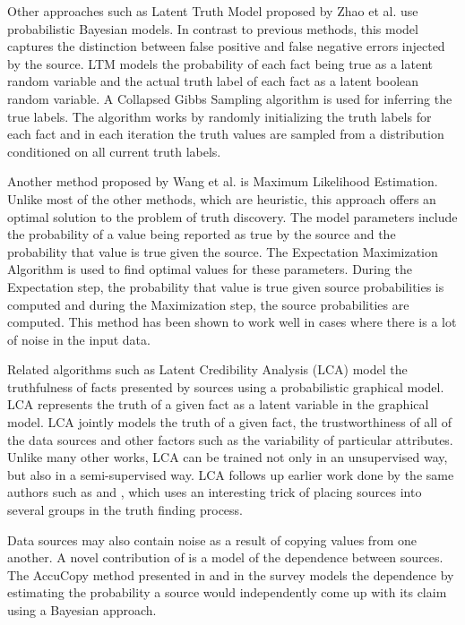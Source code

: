 \documentclass{acm_proc_article-sp}
\begin{document}
Other approaches such as Latent Truth Model proposed by Zhao et al. \cite{zhao:bayesian} use probabilistic Bayesian models. In contrast to previous methods, this model captures the distinction between false positive and false negative errors injected by the source. LTM models the probability of each fact being true as a latent random variable and the actual truth label of each fact as a latent boolean random variable. A Collapsed Gibbs Sampling algorithm is used for inferring the true labels. The algorithm works by randomly initializing the truth labels for each fact and in each iteration the truth values are sampled from a distribution conditioned on all current truth labels. 

Another method proposed by Wang et al. \cite{wang2012truth} is Maximum Likelihood Estimation. Unlike most of the other methods, which are heuristic, this approach offers an optimal solution to the problem of truth discovery. The model parameters include the probability of a value being reported as true by the source and the probability that value is true given the source. The Expectation Maximization Algorithm is used to find optimal values for these parameters. During the Expectation step, the probability that value is true given source probabilities is computed and during the Maximization step, the source probabilities are computed. This method has been shown to work well in cases where there is a lot of noise in the input data. 

Related algorithms such as Latent Credibility Analysis (LCA) \cite{pasternack:latent} model the truthfulness of facts presented by sources using a probabilistic graphical model. LCA represents the truth of a given fact as a latent variable in the graphical model. LCA jointly models the truth of a given fact, the trustworthiness of all of the data sources and other factors such as the variability of particular attributes. Unlike many other works, LCA can be trained not only in an unsupervised way, but also in a semi-supervised way. LCA follows up earlier work done by the same authors such as \cite{pasternack:knowing} and \cite{pasternack:making}, which uses an interesting trick of placing sources into several groups in the truth finding process. 


Data sources may also contain noise as a result of copying values from one another. A novel contribution of \cite{dong:integrating} is a model of the dependence between sources. The {\sc AccuCopy} method presented in \cite{dong:integrating} and in the survey \cite{li:truth} models the dependence by estimating the probability a source would independently come up with its claim using a Bayesian approach. 
\end{document}
